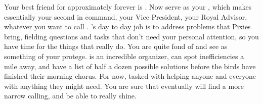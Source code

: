 \documentclass[char]{PP}
\begin{document}
\begin{contacts}
	\contact{\cSAdvisor{}} Your best friend for approximately forever is \cSAdvisor{}. Now \cSAdvisor{\They} serve\cSAdvisor{\verbs} as your \cSAdvisor{\Heir}, which makes \cSAdvisor{\them} essentially your second in command, your Vice President, your Royal Advisor, whatever you want to call \cSAdvisor{\them}. \cSAdvisor{}'s day to day job is to address problems that Pixies bring, fielding questions and tasks that don't need your personal attention, so you have time for the things that really do.
	\contact{\cSHelp{}} You are quite fond of \cSHelp{} and see \cSHelp{\them} as something of your protege. \cSHelp{} is an incredible organizer, can spot inefficiencies a mile away, and have a list of half a dozen possible solutions before the birds have finished their morning chorus. For now, \cSHelp{\Theyare} tasked with helping anyone and everyone with anything they might need. You are sure that eventually \cSHelp{} will find a more narrow calling, and be able to really shine.
\end{contacts}
\end{document}
